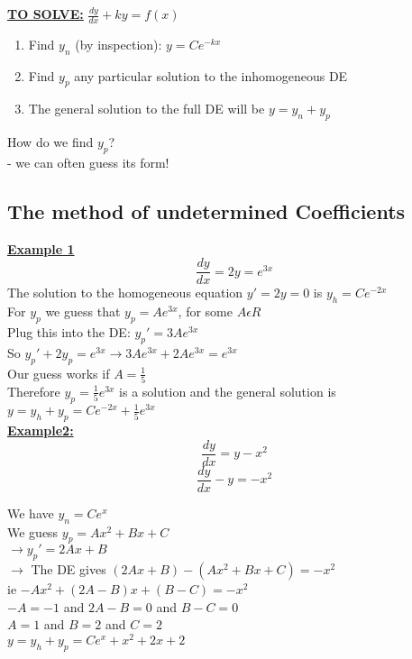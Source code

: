 \documentclass[12pt]{article}
\newcommand{\myt}[1]{\textbf{\underline{#1}}}
\begin{document}
	\myt{TO SOLVE:} $\frac{dy}{dx} + ky = f(x)$\\
	\begin{enumerate}
		\item Find $y_n$ (by inspection): $y = Ce^{-kx}$
		\item Find $y_p$ any particular solution to the inhomogeneous DE
		\item The general solution to the full DE will be $y = y_n + y_p$
	\end{enumerate}

	How do we find $y_p$?\\
	- we can often guess its form!\\
	
	\subsection*{The method of undetermined Coefficients}
	\myt{Example 1}\\
	$$\frac{dy}{dx} = 2y = e^{3x}$$
	The solution to the homogeneous equation $y' = 2y = 0$ is $y_h = Ce^{-2x}$\\
	For $y_p$ we guess that $y_p = Ae^{3x}$, for some $A \epsilon R$\\
	Plug this into the DE: $y_p' = 3Ae^{3x}$\\
	So $y_p' + 2y_p = e^{3x} \rightarrow 3Ae^{3x} + 2Ae^{3x} = e^{3x}$\\
	Our guess works if $A = \frac{1}{5}$\\
	Therefore $y_p = \frac{1}{5}e^{3x}$ is a solution and the general solution is $y = y_h + y_p = Ce^{-2x} + \frac{1}{5}e^{3x}$\\
	
	\myt{Example2:}\\
	$$\frac{dy}{dx} = y - x^2$$
	$$\frac{dy}{dx} - y = -x^2$$
	
	We have $y_n = Ce^x$\\
	We guess $y_p = Ax^2 + Bx + C$\\
	$\rightarrow y_p' = 2Ax + B$\\
	$\rightarrow$ The DE gives $(2Ax + B) - (Ax^2 + Bx + C) = -x^2$\\
	ie $-Ax^2 + (2A - B)x + (B-C) = -x^2$\\
	$-A = -1$ and $2A-B = 0$ and $B-C = 0$\\
	$A = 1$ and $B = 2$ and $C = 2$\\
	$y = y_h + y_p = Ce^x + x^2 + 2x + 2$\\\
	
\end{document}
